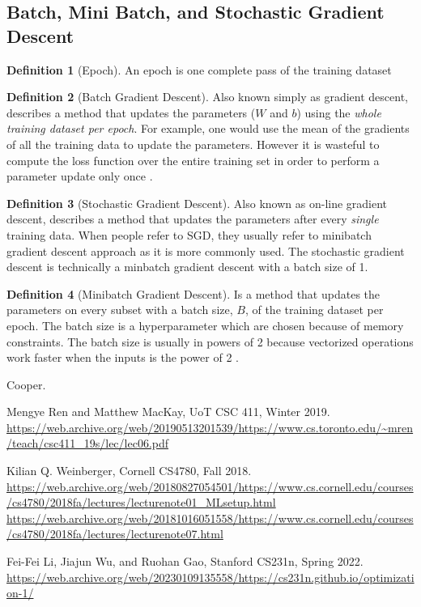 \documentclass[11pt]{article}
\numberwithin{equation}{section}
\theoremstyle{definition}%
\newtheorem{definition}{Definition}[section]%
\begin{document}
\subsection{Batch, Mini Batch, and Stochastic Gradient Descent}

\begin{definition} [Epoch]
    An epoch is one complete pass of the training dataset
\end{definition}

\begin{definition}[Batch Gradient Descent]
    Also known simply as gradient descent, describes a method that updates the parameters ($W$ and $b$) using the \emph{whole training dataset per epoch}. For example, one would use the mean of the gradients of all the training data to update the parameters. However it is wasteful to compute the loss function over the entire training set in order to perform a parameter update only once \cite{Stanford}.
\end{definition}

\begin{definition}[Stochastic Gradient Descent]
    Also known as on-line gradient descent, describes a method that updates the parameters after every \emph{single} training data. When people refer to SGD, they usually refer to minibatch gradient descent approach as it is more commonly used. The stochastic gradient descent is technically a minbatch gradient descent with a batch size of 1. 
\end{definition}

\begin{definition}[Minibatch Gradient Descent]
    Is a method that updates the parameters on every subset with a batch size, $B$, of the training dataset per epoch. The batch size is a hyperparameter which are chosen because of memory constraints. The batch size is usually in powers of 2 because vectorized operations work faster when the inputs is the power of 2 \cite{Stanford}. 
\end{definition}

\begin{thebibliography}{2}
     Cooper.

     Mengye Ren and Matthew MacKay, UoT CSC 411, Winter 2019. \url{https://web.archive.org/web/20190513201539/https://www.cs.toronto.edu/~mren/teach/csc411_19s/lec/lec06.pdf}

     Kilian Q. Weinberger, Cornell CS4780, Fall 2018.
    \url{https://web.archive.org/web/20180827054501/https://www.cs.cornell.edu/courses/cs4780/2018fa/lectures/lecturenote01_MLsetup.html}
     \url{https://web.archive.org/web/20181016051558/https://www.cs.cornell.edu/courses/cs4780/2018fa/lectures/lecturenote07.html}

     Fei-Fei Li, Jiajun Wu, and Ruohan Gao, Stanford CS231n, Spring 2022. \url{https://web.archive.org/web/20230109135558/https://cs231n.github.io/optimization-1/}

\end{thebibliography}
\end{document}
